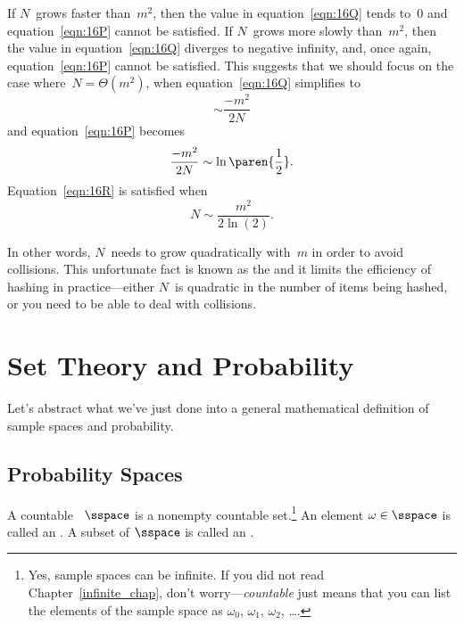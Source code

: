 \begin{editingnotes}
If $N$~grows faster than~$m^2$, then the value in
equation~\eqref{eqn:16Q} tends to~0 and equation~\eqref{eqn:16P}
cannot be satisfied.  If $N$~grows more slowly than~$m^2$, then the
value in equation~\eqref{eqn:16Q} diverges to negative infinity, and,
once again, equation~\eqref{eqn:16P} cannot be satisfied.  This suggests
that we should focus on the case where~$N = \Theta(m^2)$, when
equation~\eqref{eqn:16Q} simplifies to
\begin{equation*}
    \sim \frac{-m^2}{2N}
\end{equation*}
and equation~\eqref{eqn:16P} becomes
\begin{equation}\label{eqn:16R}
    \frac{-m^2}{2N} \sim \ln\paren{\frac{1}{2}}.
\end{equation}
Equation~\eqref{eqn:16R} is satisfied when
\begin{equation}\label{eqn:16S}
    N \sim \frac{m^2}{2 \ln(2)}.
\end{equation}

In other words, $N$~needs to grow quadratically with~$m$ in order to
avoid collisions.  This unfortunate fact is known as the
 and it limits the efficiency of hashing in
practice---either $N$~is quadratic in the number of items being hashed,
or you need to be able to deal with collisions.
\end{editingnotes}

\section{Set Theory and Probability}\label{probability_sets_sec}

Let's abstract what we've just done into a general mathematical
definition of sample spaces and probability.

\subsection{Probability Spaces}

\begin{definition}\label{LN12:sampsp}
  A countable ~$\sspace$ is a nonempty countable
  set.\footnote{Yes, sample spaces can be infinite.  If you did not
    read Chapter~\ref{infinite_chap}, don't worry---\emph{countable}
    just means that you can list the elements of the sample space as
    $\omega_0$, $\omega_1$, $\omega_2$, \dots.}  An element $\omega
  \in \sspace$ is called an .  A subset of $\sspace$ is
  called an .
\end{definition}

